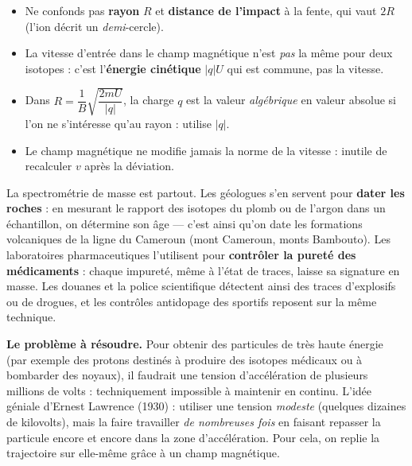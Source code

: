 \documentclass[11pt]{article}
\newcounter{popsec}
\newcounter{popsub}
\newcommand{\courssub}[1]{%
  \stepcounter{popsub}%
  \par\vspace{9pt}\noindent{\popxbold\fontsize{11.5}{13}\selectfont\color{popink}{\color{poporange}\thepopsec.\thepopsub}\hspace{6pt}#1}\par\nopagebreak\vspace{4pt}
}
\begin{document}
\begin{attention}
\begin{itemize}
\item Ne confonds pas \textbf{rayon} $R$ et \textbf{distance de l'impact} à la fente, qui vaut $2R$ (l'ion décrit un \emph{demi}-cercle).
\item La vitesse d'entrée dans le champ magnétique n'est \emph{pas} la même pour deux isotopes : c'est l'\textbf{énergie cinétique} $|q|U$ qui est commune, pas la vitesse.
\item Dans $R = \dfrac{1}{B}\sqrt{\dfrac{2mU}{|q|}}$, la charge $q$ est la valeur \emph{algébrique} en valeur absolue si l'on ne s'intéresse qu'au rayon : utilise $|q|$.
\item Le champ magnétique ne modifie jamais la norme de la vitesse : inutile de recalculer $v$ après la déviation.
\end{itemize}
\end{attention}

\begin{savaistu}
La spectrométrie de masse est partout. Les géologues s'en servent pour \textbf{dater les roches} : en mesurant le rapport des isotopes du plomb ou de l'argon dans un échantillon, on détermine son âge — c'est ainsi qu'on date les formations volcaniques de la ligne du Cameroun (mont Cameroun, monts Bambouto). Les laboratoires pharmaceutiques l'utilisent pour \textbf{contrôler la pureté des médicaments} : chaque impureté, même à l'état de traces, laisse sa signature en masse. Les douanes et la police scientifique détectent ainsi des traces d'explosifs ou de drogues, et les contrôles antidopage des sportifs reposent sur la même technique.
\end{savaistu}

\courssub{Le cyclotron}

\textbf{Le problème à résoudre.} Pour obtenir des particules de très haute énergie (par exemple des protons destinés à produire des isotopes médicaux ou à bombarder des noyaux), il faudrait une tension d'accélération de plusieurs millions de volts : techniquement impossible à maintenir en continu. L'idée géniale d'Ernest Lawrence (1930) : utiliser une tension \emph{modeste} (quelques dizaines de kilovolts), mais la faire travailler \emph{de nombreuses fois} en faisant repasser la particule encore et encore dans la zone d'accélération. Pour cela, on replie la trajectoire sur elle-même grâce à un champ magnétique.
\end{document}
